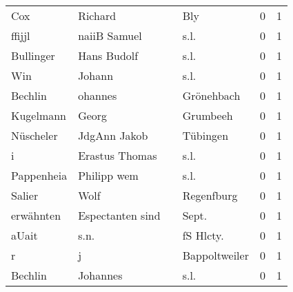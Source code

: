 \begin{center}
\begin{tiny}
\begin{longtabu}{llllrr}
                      Cox &                            Richard &             &                                         Bly &          0 &         1 \\
                   ffijjl &                       naiiB Samuel &             &                                        s.l. &          0 &         1 \\
                Bullinger &                        Hans Budolf &             &                                        s.l. &          0 &         1 \\
                      Win &                             Johann &             &                                        s.l. &          0 &         1 \\
                  Bechlin &                            ohannes &             &                                  Grönehbach &          0 &         1 \\
                Kugelmann &                              Georg &             &                                    Grumbeeh &          0 &         1 \\
                Nüscheler &                       JdgAnn Jakob &             &                                    Tübingen &          0 &         1 \\
                        i &                     Erastus Thomas &             &                                        s.l. &          0 &         1 \\
               Pappenheia &                        Philipp wem &             &                                        s.l. &          0 &         1 \\
                   Salier &                               Wolf &             &                                  Regenfburg &          0 &         1 \\
                erwähnten &                   Espectanten sind &             &                                      Sept.  &          0 &         1 \\
                    aUait &                               s.n. &             &                                  fS Hlcty.  &          0 &         1 \\
                        r &                                  j &             &                               Bappoltweiler &          0 &         1 \\
                  Bechlin &                           Johannes &             &                                        s.l. &          0 &         1 \\

\end{longtabu}
\end{tiny}
\end{center}
